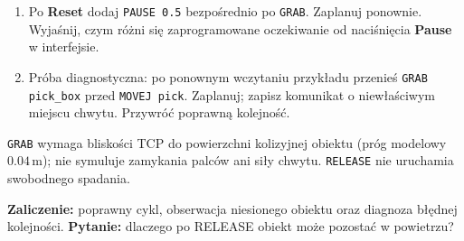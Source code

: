 \documentclass[10pt,a4paper]{article}
\newcommand{\ui}[1]{\textbf{\textsf{#1}}}
\newcommand{\cmd}[1]{\texttt{#1}}
\begin{document}
\begin{enumerate}[resume]
\item Po \ui{Reset} dodaj \cmd{PAUSE 0.5} bezpośrednio po \cmd{GRAB}. Zaplanuj ponownie. Wyjaśnij, czym różni się zaprogramowane oczekiwanie od naciśnięcia \ui{Pause} w interfejsie.
\item Próba diagnostyczna: po ponownym wczytaniu przykładu przenieś \cmd{GRAB pick\_box} przed \cmd{MOVEJ pick}. Zaplanuj; zapisz komunikat o niewłaściwym miejscu chwytu. Przywróć poprawną kolejność.
\end{enumerate}
\begin{remember}\cmd{GRAB} wymaga bliskości TCP do powierzchni kolizyjnej obiektu (próg modelowy \(0.04\,\mathrm{m}\)); nie symuluje zamykania palców ani siły chwytu. \cmd{RELEASE} nie uruchamia swobodnego spadania.\end{remember}
\textbf{Zaliczenie:} poprawny cykl, obserwacja niesionego obiektu oraz diagnoza błędnej kolejności. \textbf{Pytanie:} dlaczego po RELEASE obiekt może pozostać w powietrzu?
\end{document}
